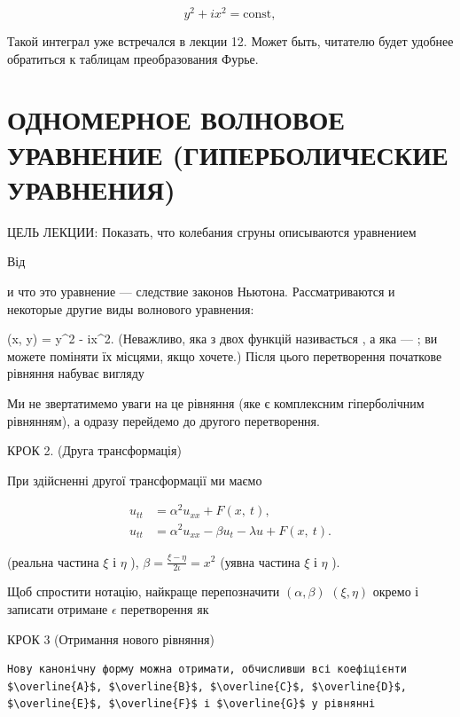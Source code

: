 \documentclass[
  ukrainian,
]{article}
\begin{document}
\[
y^2 + ix^2 = \text{const},
\]

Такой интеграл уже встречался в лекции 12. Может быть, читателю будет
удобнее обратиться к таблицам преобразования Фурье.

\section{ОДНОМЕРНОЕ ВОЛНОВОЕ УРАВНЕНИЕ (ГИПЕРБОЛИЧЕСКИЕ
УРАВНЕНИЯ)}\label{ux43eux434ux43dux43eux43cux435ux440ux43dux43eux435-ux432ux43eux43bux43dux43eux432ux43eux435-ux443ux440ux430ux432ux43dux435ux43dux438ux435-ux433ux438ux43fux435ux440ux431ux43eux43bux438ux447ux435ux441ux43aux438ux435-ux443ux440ux430ux432ux43dux435ux43dux438ux44f}

ЦЕЛЬ ЛЕКЦИИ: Показать, что колебания сгруны описываются уравнением

Від

и что это уравнение --- следствие законов Ньютона. Рассматриваются и
некоторые другие виды волнового уравнения:

\eta(x, y) = y\^{}2 - ix\^{}2. (Неважливо, яка з двох функцій
називається \xi , а яка --- \eta ; ви можете поміняти їх місцями, якщо
хочете.) Після цього перетворення початкове рівняння набуває вигляду

Ми не звертатимемо уваги на це рівняння (яке є комплексним гіперболічним
рівнянням), а одразу перейдемо до другого перетворення.

КРОК 2. (Друга трансформація)

При здійсненні другої трансформації ми маємо

\[
\begin{split} u_{tt} &= \alpha^2 u_{xx} + F\left(x, \ t\right), \\ u_{tt} &= \alpha^2 u_{xx} - \beta u_t - \lambda u + F\left(x, \ t\right). \end{split}
\]

(реальна частина \(\xi\) і \(\eta\) ),
\(\beta = \frac{\xi - \eta}{2\iota} = x^2\) (уявна частина \(\xi\) і
\(\eta\) ).

Щоб спростити нотацію, найкраще перепозначити \((\alpha,\beta)\)
\((\xi,\eta)\) окремо і записати отримане \(\epsilon\) перетворення як

КРОК 3 (Отримання нового рівняння)

\begin{verbatim}
Нову канонічну форму можна отримати, обчисливши всі коефіцієнти $\overline{A}$, $\overline{B}$, $\overline{C}$, $\overline{D}$, $\overline{E}$, $\overline{F}$ і $\overline{G}$ у рівнянні
\end{verbatim}
\end{document}
